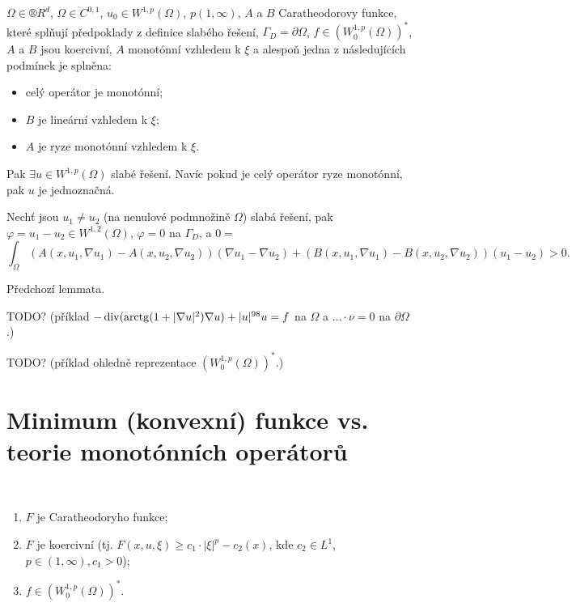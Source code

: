 \documentclass[12pt]{article}					%
\begin{document}
\begin{veta}
	$Ω \in ®R^d$, $Ω \in C^{0, 1}$, $u_0 \in W^{1, p}(Ω)$, $p(1, ∞)$, $A$ a $B$ Caratheodorovy funkce, které splňují předpoklady z definice slabého řešení, $Γ_D = \partial Ω$, $f \in (W_0^{1, p}(Ω))^*$, $A$ a $B$ jsou koercivní, $A$ monotónní vzhledem k $ξ$ a alespoň jedna z následujících podmínek je splněna:
	\begin{itemize}
		\item celý operátor je monotónní;
		\item $B$ je lineární vzhledem k $ξ$;
		\item $A$ je ryze monotónní vzhledem k $ξ$.
	\end{itemize}
	Pak $\exists u \in W^{1, p}(Ω)$ slabé řešení. Navíc pokud je celý operátor ryze monotónní, pak $u$ je jednoznačná.

	\begin{dukazin}[Jednoznačnost]
		Nechť jsou $u_1 ≠ u_2$ (na nenulové podmnožině $Ω$) slabá řešení, pak $φ = u_1 - u_2 \in W^{1, 2}(Ω)$, $φ = 0$ na $Γ_D$, a $0 =$
		$$ \!\int_Ω\! (A(x, u_1, \nabla u_1) - A(x, u_2, \nabla u_2))(\nabla u_1 - \nabla u_2) + (B(x, u_1, \nabla u_1) - B(x, u_2, \nabla u_2))(u_1 - u_2) > 0. $$
	\end{dukazin}

	\begin{dukazin}[Existence]
		Předchozí lemmata.
	\end{dukazin}
\end{veta}

TODO? (příklad $-\operatorname{div}(\operatorname{arctg}(1 + |\nabla u|^2)\nabla u) + |u|^{98} u = f$ na $Ω$ a $…·ν = 0$ na $\partial Ω$.)

TODO? (příklad ohledně reprezentace $(W_0^{1, p}(Ω))^*$.)

\section{Minimum (konvexní) funkce vs. teorie monotónních operátorů}
\begin{definice}[Předpoklady]
	\ 
	\begin{enumerate}
		\item $F$ je Caratheodoryho funkce;
		\item $F$ je koercivní (tj. $F(x, u, ξ) ≥ c_1·|ξ|^p - c_2(x)$, kde $c_2 \in L^1$, $p\in (1, ∞), c_1 > 0$);
		\item $f \in (W_0^{1, p}(Ω))^*$.
	\end{enumerate}
\end{definice}
\end{document}
